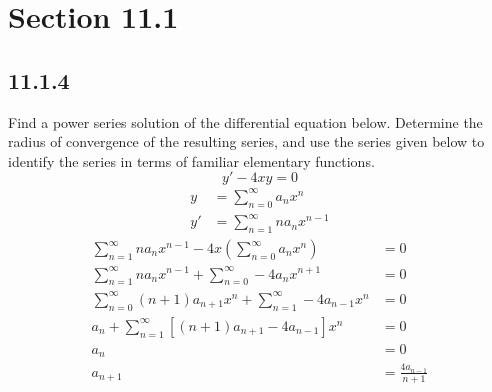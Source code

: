 \documentclass{article}
\begin{document}
\newcommand{\hr}{\par\noindent\rule{\textwidth}{0.4pt}}

\newcommand{\bc}[1]{
	\begin{equation*}
		\begin{boxed}
			{#1}
		\end{boxed}
	\end{equation*}
}

\newcommand{\cond}[2]{
	\ifmmode
		{#1} \quad {#2}
	\else
		$$ {#1} \quad {#2} $$
	\fi
}

\newcommand{\matr}[1]{
	\ifmmode \bm{#1}
	\else \textit{\textbf{#1}}
	\fi
}
\newcommand{\vect}[1]{
	\ifmmode \mathbf{#1}
	\else \textbf{#1}
	\fi
}


\tableofcontents

\section{Section 11.1}

\subsection{11.1.4}

Find a power series solution of the differential equation below. Determine the radius of convergence of the resulting series, and use the series given below to identify the series in terms of familiar elementary functions.
\begin{equation*}
	y' - 4xy = 0
\end{equation*}
\begin{align*}
	y & = \sum_{n = 0}^{\infty} a_nx^n \\
	y' & = \sum_{n = 1}^{\infty} na_nx^{n - 1}
\end{align*}
\begin{align*}
	\sum_{n = 1}^{\infty} na_nx^{n - 1} - 4x \left( \sum_{n = 0}^{\infty} a_nx^n \right) & = 0 \\
	\sum_{n = 1}^{\infty} na_nx^{n - 1} + \sum_{n = 0}^{\infty} -4a_nx^{n + 1} & = 0 \\
	\sum_{n = 0}^{\infty} (n + 1)a_{n + 1}x^{n} + \sum_{n = 1}^{\infty} -4a_{n - 1}x^{n} & = 0 \\
	a_n + \sum_{n = 1}^{\infty} \left[ (n + 1)a_{n + 1} - 4a_{n - 1} \right] x^n & = 0 \\
	a_n & = 0 \\
	a_{n + 1} & = \frac{ 4a_{n - 1} }{ n + 1 }
\end{align*}
\begin{align*}
\end{align*}
\end{document}
